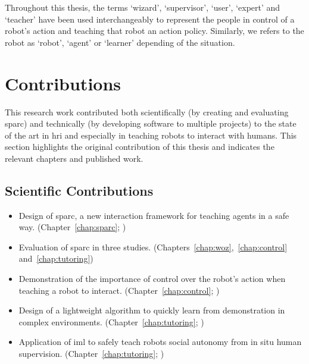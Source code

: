 Throughout this thesis, the terms `wizard', `supervisor', `user', `expert' and `teacher' have been used interchangeably to represent the people in control of a robot's action and teaching that robot an action policy. Similarly, we refers to the robot as `robot', `agent' or `learner' depending of the situation.
%
%

\section{Contributions}\label{sec:intro-contr}

This research work contributed both scientifically (by creating and evaluating \gls{sparc}) and technically (by developing software to multiple projects) to the state of the art in \gls{hri} and especially in teaching robots to interact with humans. This section highlights the original contribution of this thesis and indicates the relevant chapters and published work.

\subsection{Scientific Contributions}
\begin{itemize}
	\item Design of \gls{sparc}, a new interaction framework for teaching agents in a safe way. (Chapter~\ref{chap:sparc}; \citealt{senft2015human,senft2015sparc})
	\item Evaluation of \gls{sparc} in three studies. (Chapters~\ref{chap:woz},~\ref{chap:control} and~\ref{chap:tutoring})
	\item Demonstration of the importance of control over the robot's action when teaching a robot to interact. (Chapter~\ref{chap:control}; \citealt{senft2016sparc,senft2017supervised})
	\item Design of a lightweight algorithm to quickly learn from demonstration in complex environments. (Chapter~\ref{chap:tutoring}; \citealt{senft2017toward})
	\item Application of \gls{iml} to safely teach robots social autonomy from in situ human supervision. (Chapter~\ref{chap:tutoring}; \citealt{senft2018robots})
\end{itemize}

